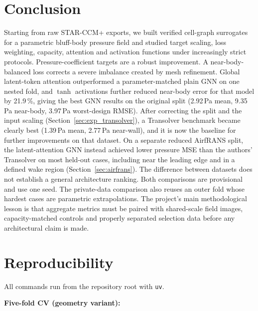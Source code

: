 \documentclass[journal]{IEEEtran}
\begin{document}
\section{Conclusion}
Starting from raw STAR-CCM+ exports, we built verified cell-graph surrogates for
a parametric bluff-body pressure field and studied target scaling, loss
weighting, capacity, attention and activation functions under increasingly
strict protocols. Pressure-coefficient targets are a robust improvement. A
near-body-balanced loss corrects a severe imbalance created by mesh refinement.
Global latent-token attention outperformed a parameter-matched plain GNN on one
nested fold, and $\tanh$ activations further reduced near-body error for that
model by 21.9\,\%, giving the best GNN results on the original split (2.92\,Pa mean,
9.35\,Pa near-body, 3.97\,Pa worst-design RMSE). After correcting the split and
the input scaling (Section~\ref{sec:exp_transolver}), a Transolver benchmark
became clearly best (1.39\,Pa mean, 2.77\,Pa near-wall), and it is now the
baseline for further improvements on that dataset. On a separate reduced
AirfRANS split, the latent-attention GNN instead achieved lower pressure MSE
than the authors' Transolver on most held-out cases, including near the leading
edge and in a defined wake region (Section~\ref{sec:airfrans}). The difference
between datasets does not establish a general architecture ranking. Both
comparisons are provisional and use one seed. The private-data comparison also
reuses an outer fold whose hardest cases are parametric extrapolations. The
project's main methodological lesson
is that aggregate metrics must be paired with shared-scale field images,
capacity-matched controls and properly separated selection data before any
architectural claim is made.

\appendices
\section{Reproducibility}
\label{app:repro}
All commands run from the repository root with \texttt{uv}.

\noindent\textbf{Five-fold CV (geometry variant):}\\
\end{document}
